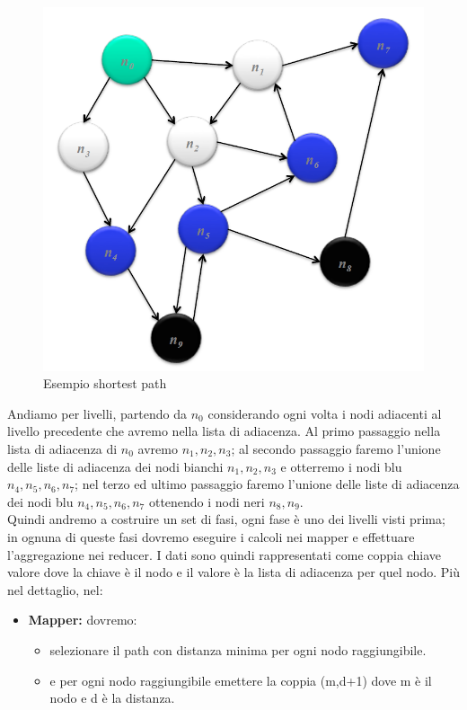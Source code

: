 \documentclass{article}
\begin{document}
\begin{appendices}
\begin{figure}[H]
    \includegraphics[scale=0.5]{img/ShortestPath.PNG}
    \caption{Esempio shortest path}
\end{figure}
Andiamo per livelli, partendo da $n_0$ considerando ogni volta i nodi adiacenti al livello precedente che avremo nella lista di adiacenza. Al primo passaggio nella lista di adiacenza di $n_0$ avremo $n_1,n_2,n_3$; al secondo passaggio faremo l'unione delle liste di adiacenza dei nodi bianchi $n_1,n_2,n_3$ e otterremo i nodi blu $n_4,n_5,n_6,n_7$; nel terzo ed ultimo passaggio faremo l'unione delle liste di adiacenza dei nodi blu $n_4,n_5,n_6,n_7$ ottenendo i nodi neri $n_8,n_9$.\\
Quindi andremo a costruire un set di fasi, ogni fase è uno dei livelli visti prima; in ognuna di queste fasi dovremo eseguire i calcoli nei mapper e effettuare l'aggregazione nei reducer. I dati sono quindi rappresentati come coppia chiave valore dove la chiave è il nodo e il valore è la lista di adiacenza per quel nodo. Più nel dettaglio, nel:
\begin{itemize}
    \item \textbf{Mapper:} dovremo:
        \begin{itemize}
        \item selezionare il path con distanza minima per ogni nodo raggiungibile.
        \item e per ogni nodo raggiungibile emettere la coppia (m,d+1) dove m è il nodo e d è la distanza.

\end{itemize}
\end{itemize}
\end{appendices}
\end{document}
